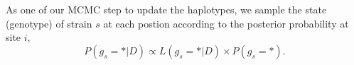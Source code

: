 \documentclass{bioinfo}
\begin{document}
\begin{methods}
As one of our MCMC step to update the haplotypes, we sample the state (genotype) of strain $s$ at each postion according to the posterior probability at site $i$,
\begin{equation}
P(g_s = * | D) \propto L(g_s=*|D) \times P(g_s = *).\label{eqn:post:LDfree}
\end{equation}










\end{methods}
\end{document}
